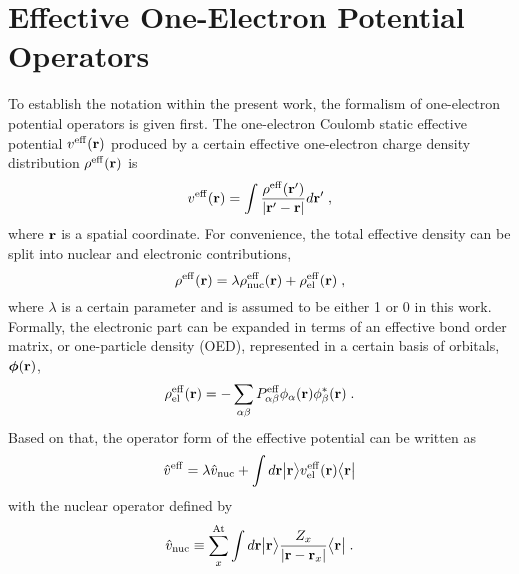 \documentclass[aip,jcp,amsmath,amssymb,reprint,floatfix]{revtex4-1}
\begin{document}
\section{\label{s:2.oep}Effective One-Electron Potential Operators}

To establish the notation within the present work, 
the formalism of one\hyp{}electron potential operators is
given first.
The one\hyp{}electron Coulomb static effective potential $v^{\rm eff}({\bf r})$
produced by a certain effective one\hyp{}electron charge density distribution $\rho^{\rm eff}({\bf r})$
is 
%
\begin{equation} \label{e:v-eff}
	v^{\rm eff}({\bf r}) = \int \frac{ \rho^{\rm eff}({\bf r}') }{ \vert {\bf r}' - {\bf r} \vert} d{\bf r}' \;,
\end{equation}
%
where ${\bf r}$ is a spatial coordinate. 
For convenience, the total effective density can be split into nuclear and electronic contributions,
%
\begin{equation} \label{e:rho-eff}
 \rho^{\rm eff}({\bf r}) = \lambda \rho^{\rm eff}_{\rm nuc}({\bf r}) + \rho^{\rm eff}_{\rm el}({\bf r}) \;,
\end{equation}
%
where $\lambda$ is a certain parameter and is assumed to be either 1 or 0 in this work.
Formally, the electronic part can be expanded in terms of an effective
bond order matrix, or one\hyp{}particle density (OED), represented in a certain basis of orbitals, $\BM{\phi}({\bf r})$,
%
\begin{equation} \label{e:d-spectral}
	\rho^{\rm eff}_{\rm el}({\bf r}) = -\sum_{\alpha\beta} P_{\alpha\beta}^{\rm eff} 
	\phi_\alpha({\bf r}) \phi_\beta^{*}({\bf r})  \;.
\end{equation}
%
Based on that, the operator form of the effective potential 
can be written as
%
\begin{equation} \label{e:oep-operator}
	\hat{v}^{\rm eff} = 
        \lambda \hat{v}_{\rm nuc} +
        \int d{\bf r} \Ket{{\bf r}} 
        v^{\rm eff}_{\rm el}({\bf r})
        \Bra{{\bf r}}
\end{equation}
%
with the nuclear
operator
defined by
%
\begin{equation} \label{e:oep-operator-nuc}
        \hat{v}_{\rm nuc} \equiv \sum_x^{\rm At}  
                     \int d{\bf r} \Ket{{\bf r}} 
                     \frac{Z_x}{\vert {\bf r} - {\bf r}_x \vert}
                     \Bra{{\bf r}} \;.
\end{equation}
\end{document}
